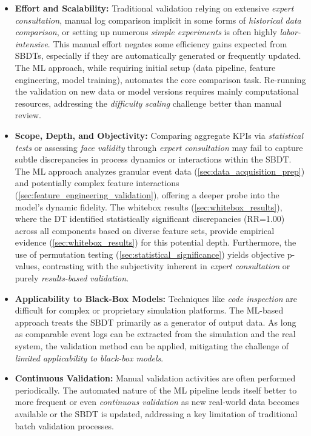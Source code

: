 \begin{itemize}
  \item \textbf{Effort and Scalability:} Traditional validation relying on extensive \textit{expert consultation}, manual log comparison implicit in some forms of \textit{historical data comparison}, or setting up numerous \textit{simple experiments} is often highly \textit{labor-intensive}. This manual effort negates some efficiency gains expected from SBDTs, especially if they are automatically generated or frequently updated. The ML approach, while requiring initial setup (data pipeline, feature engineering, model training), automates the core comparison task. Re-running the validation on new data or model versions requires mainly computational resources, addressing the \textit{difficulty scaling} challenge better than manual review.

  \item \textbf{Scope, Depth, and Objectivity:} Comparing aggregate KPIs via \textit{statistical tests} or assessing \textit{face validity} through \textit{expert consultation} may fail to capture subtle discrepancies in process dynamics or interactions within the SBDT. The ML approach analyzes granular event data (\autoref{sec:data_acquisition_prep}) and potentially complex feature interactions (\autoref{sec:feature_engineering_validation}), offering a deeper probe into the model's dynamic fidelity. The whitebox results (\autoref{sec:whitebox_results}), where the DT identified statistically significant discrepancies (RR=1.00) across all components based on diverse feature sets, provide empirical evidence (\autoref{sec:whitebox_results}) for this potential depth. Furthermore, the use of permutation testing (\autoref{sec:statistical_significance}) yields objective p-values, contrasting with the subjectivity inherent in \textit{expert consultation} or purely \textit{results-based validation}.

  \item \textbf{Applicability to Black-Box Models:} Techniques like \textit{code inspection} are difficult for complex or proprietary simulation platforms. The ML-based approach treats the SBDT primarily as a generator of output data. As long as comparable event logs can be extracted from the simulation and the real system, the validation method can be applied, mitigating the challenge of \textit{limited applicability to black-box models}.

  \item \textbf{Continuous Validation:} Manual validation activities are often performed periodically. The automated nature of the ML pipeline lends itself better to more frequent or even \textit{continuous validation} as new real-world data becomes available or the SBDT is updated, addressing a key limitation of traditional batch validation processes.


\end{itemize}
